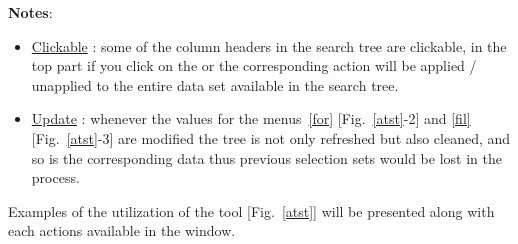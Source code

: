 {\bf{Notes}}:
\begin{itemize}
\item \uline{Clickable} : some of the column headers in the search tree are clickable, in the top part if you click on the  or  the corresponding action will be applied / unapplied to the entire data set available in the search tree. 
\item \uline{Update} : whenever the values for the menus~\ref{for} [Fig.~\ref{atst}-2] and \ref{fil} [Fig.~\ref{atst}-3] are modified 
the tree is not only refreshed but also cleaned, and so is the corresponding data thus previous selection sets would be lost in the process.
\end{itemize}
Examples of the utilization of the  tool [Fig.~\ref{atst}] will be presented along with each actions available in the  window. 

